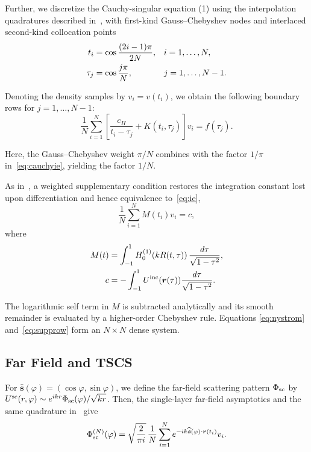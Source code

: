 \documentclass[conference]{IEEEtran}
\begin{document}
Further, we discretize the Cauchy-singular equation (1) using the interpolation 
quadratures described in~\cite{nosich2005,nosich2007,nosich_josa2007}, with first-kind
Gauss--Chebyshev nodes and interlaced second-kind collocation points
\begin{align}
 t_i&=\cos\frac{(2i-1)\pi}{2N},&&i=1,\ldots,N, \notag\\
 \tau_j&=\cos\frac{j\pi}{N},&&j=1,\ldots,N-1.                    \label{eq:nodes}
\end{align}

Denoting the density samples by $v_i=v(t_i)$, we obtain the following
boundary rows for $j=1,\ldots,N-1$:
\begin{equation}
 \frac{1}{N}\sum_{i=1}^{N}
 \left[\frac{c_H}{t_i-\tau_j}+K(t_i,\tau_j)\right]v_i=f(\tau_j).
 \label{eq:nystrom}
\end{equation}

Here, the Gauss--Chebyshev weight $\pi/N$ combines with the factor $1/\pi$
in~\eqref{eq:cauchyie}, yielding the factor $1/N$.

As in~\cite{nosich2005,nosich2007}, a weighted supplementary condition restores
the integration constant lost upon differentiation and hence equivalence
to~\eqref{eq:ie},
\begin{equation}
 \frac{1}{N}\sum_{i=1}^{N}M(t_i)v_i=c,                                  \label{eq:supprow}
\end{equation}
where
\begin{align}
 M(t)&=\int_{-1}^{1}H_0^{(1)}\!\left(kR(t,\tau)\right)
          \frac{d\tau}{\sqrt{1-\tau^2}},                                \label{eq:mdef}\\
 c&=-\int_{-1}^{1}U^{\rm inc}(\boldsymbol r(\tau))
          \frac{d\tau}{\sqrt{1-\tau^2}}.                               \label{eq:cdef}
\end{align}

The logarithmic self term in $M$ is subtracted analytically and its smooth
remainder is evaluated by a higher-order Chebyshev rule.  Equations
\eqref{eq:nystrom} and~\eqref{eq:supprow} form an $N\times N$ dense system.

\subsection{Far Field and TSCS}

For $\widehat{\boldsymbol s}(\varphi)=(\cos\varphi,\sin\varphi)$, we define
the far-field scattering pattern $\Phi_{\rm sc}$ by
$U^{\rm sc}(r,\varphi)\sim e^{ikr}\Phi_{\rm sc}(\varphi)/\sqrt{kr}$.
Then, the single-layer far-field asymptotics and the same quadrature
in~\cite{nosich2007} give
\begin{equation}
 \Phi_{\rm sc}^{(N)}(\varphi)
 =\sqrt{\frac{2}{\pi i}}\,\frac{1}{N}\sum_{i=1}^{N}
 e^{-ik\widehat{\boldsymbol s}(\varphi)\cdot\boldsymbol r(t_i)}v_i.
 \label{eq:farfield}
\end{equation}
\end{document}
